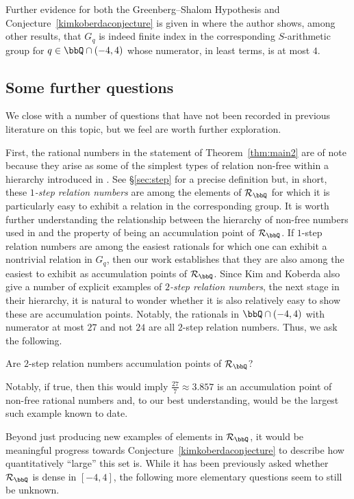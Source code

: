 \documentclass[11 pt]{amsart}
\begin{document}
Further evidence for both the Greenberg--Shalom Hypothesis and Conjecture~\ref{kimkoberdaconjecture} is given in \cite{nybergbrodda} where the author shows, among other results, that $G_q$ is indeed finite index in the corresponding $S$-arithmetic group for $q\in\bbQ\cap(-4,4)$ whose numerator, in least terms, is at most $4$. 

\subsection{Some further questions}
We close with a number of questions that have not been recorded in previous literature on this topic, but we feel are worth further exploration.

First, the rational numbers in the statement of Theorem~\ref{thm:main2} are of note because they arise as some of the simplest types of relation non-free within a hierarchy introduced in \cite{kimkoberda}. See \S\ref{sec:step} for a precise definition but, in short, these \textit{$1$-step relation numbers} are among the elements of $\mathcal{R}_\bbQ$ for which it is particularly easy to exhibit a relation in the corresponding group. It is worth further understanding the relationship between the hierarchy of non-free numbers used in \cite{kimkoberda} and the property of being an accumulation point of $\mathcal{R}_\bbQ$. If $1$-step relation numbers are among the easiest rationals for which one can exhibit a nontrivial relation in $G_q$, then our work establishes that they are also among the easiest to exhibit as accumulation points of $\mathcal{R}_\bbQ$. Since Kim and Koberda also give a number of explicit examples of \textit{$2$-step relation numbers}, the next stage in their hierarchy, it is natural to wonder whether it is also relatively easy to show these are accumulation points. Notably, the rationals in $\bbQ\cap(-4,4)$ with numerator at most $27$ and not $24$ are all $2$-step relation numbers. Thus, we ask the following.

\begin{question}
    Are $2$-step relation numbers accumulation points of $\mathcal{R}_\bbQ$?
\end{question}

Notably, if true, then this would imply $\frac{27}{7}\approx 3.857$ is an accumulation point of non-free rational numbers and, to our best understanding, would be the largest such example known to date. 

Beyond just producing new examples of elements in $\mathcal{R}_\bbQ$, it would be meaningful progress towards Conjecture~\ref{kimkoberdaconjecture} to describe how quantitatively ``large'' this set is. While it has been previously asked whether $\mathcal{R}_\bbQ$ is dense in $[-4,4]$, the following more elementary questions seem to still be unknown.
\end{document}
